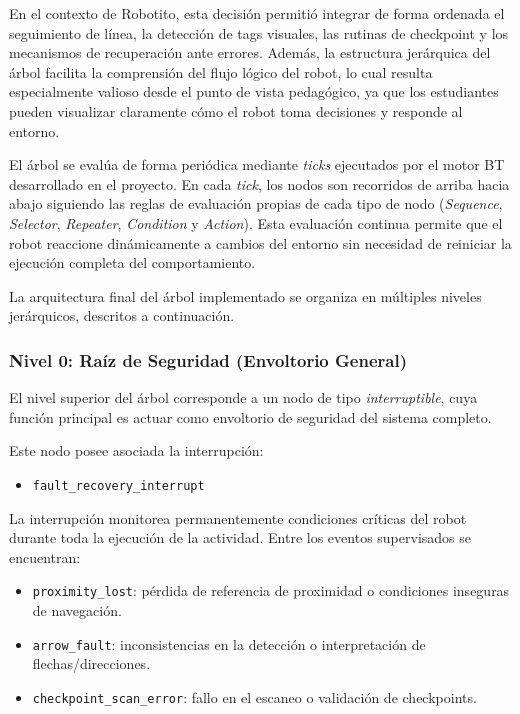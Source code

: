 \documentclass{prgrado}
\begin{document}
En el contexto de Robotito, esta decisión permitió integrar de forma ordenada el seguimiento de línea, la detección de tags visuales, las rutinas de checkpoint y los mecanismos de recuperación ante errores. Además, la estructura jerárquica del árbol facilita la comprensión del flujo lógico del robot, lo cual resulta especialmente valioso desde el punto de vista pedagógico, ya que los estudiantes pueden visualizar claramente cómo el robot toma decisiones y responde al entorno.

El árbol se evalúa de forma periódica mediante \textit{ticks} ejecutados por el motor BT desarrollado en el proyecto. En cada \textit{tick}, los nodos son recorridos de arriba hacia abajo siguiendo las reglas de evaluación propias de cada tipo de nodo (\textit{Sequence}, \textit{Selector}, \textit{Repeater}, \textit{Condition} y \textit{Action}). Esta evaluación continua permite que el robot reaccione dinámicamente a cambios del entorno sin necesidad de reiniciar la ejecución completa del comportamiento.

La arquitectura final del árbol implementado se organiza en múltiples niveles jerárquicos, descritos a continuación.

\subsubsection{Nivel 0: Raíz de Seguridad (Envoltorio General)}

El nivel superior del árbol corresponde a un nodo de tipo \textit{interruptible}, cuya función principal es actuar como envoltorio de seguridad del sistema completo.

Este nodo posee asociada la interrupción:

\begin{itemize}
    \item \texttt{fault\_recovery\_interrupt}
\end{itemize}

La interrupción monitorea permanentemente condiciones críticas del robot durante toda la ejecución de la actividad. Entre los eventos supervisados se encuentran:

\begin{itemize}
    \item \texttt{proximity\_lost}: pérdida de referencia de proximidad o condiciones inseguras de navegación.
    \item \texttt{arrow\_fault}: inconsistencias en la detección o interpretación de flechas/direcciones.
    \item \texttt{checkpoint\_scan\_error}: fallo en el escaneo o validación de checkpoints.
\end{itemize}
\end{document}
